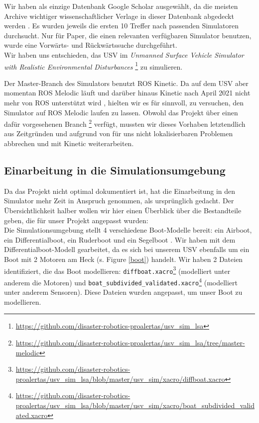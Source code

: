 \documentclass[conference]{IEEEtran}
\begin{document}
Wir haben als einzige Datenbank Google Scholar ausgewählt, da die meisten Archive wichtiger wissenschaftlicher Verlage in dieser Datenbank abgedeckt werden \cite{googlescholar}. Es wurden jeweils die ersten 10 Treffer nach passenden Simulatoren durchsucht. Nur für Paper, die einen relevanten verfügbaren Simulator benutzen, wurde eine Vorwärts- und Rückwärtssuche durchgeführt.\\

Wir haben uns entschieden, das USV im \textit{Unmanned Surface Vehicle Simulator with Realistic Environmental Disturbances} \footnote{\url{https://github.com/disaster-robotics-proalertas/usv_sim_lsa}} zu simulieren.

Der Master-Branch des Simulators benutzt ROS Kinetic. Da auf dem USV aber momentan ROS Melodic läuft und darüber hinaus Kinetic nach April 2021 nicht mehr von ROS unterstützt wird \cite{rosdistros}, hielten wir es für sinnvoll, zu versuchen, den Simulator auf ROS Melodic laufen zu lassen. Obwohl das Projekt über einen dafür vorgesehenen Branch \footnote{\url{https://github.com/disaster-robotics-proalertas/usv_sim_lsa/tree/master-melodic}} verfügt, mussten wir dieses Vorhaben letztendlich aus Zeitgründen und aufgrund von für uns nicht lokalisierbaren Problemen abbrechen und mit Kinetic weiterarbeiten.

\subsection{Einarbeitung in die Simulationsumgebung}

Da das Projekt nicht optimal dokumentiert ist, hat die Einarbeitung in den Simulator mehr Zeit in Anspruch genommen, als ursprünglich gedacht. Der Übersichtlichkeit halber wollen wir hier einen Überblick über die Bestandteile geben, die für unser Projekt angepasst wurden:\\
Die Simulationsumgebung stellt 4 verschiedene Boot-Modelle bereit: ein Airboot, ein Differentialboot, ein Ruderboot und ein Segelboot \cite{paravisi2019}. Wir haben mit dem Differentialboot-Modell gearbeitet, da es sich bei unserem USV ebenfalls um ein Boot mit 2 Motoren am Heck (s. Figure \ref{boot}) handelt. Wir haben 2 Dateien identifiziert, die das Boot modellieren: \texttt{diffboat.xacro}\footnote{\url{https://github.com/disaster-robotics-proalertas/usv_sim_lsa/blob/master/usv_sim/xacro/diffboat.xacro}} (modelliert unter anderem die Motoren) und \texttt{boat\_subdivided\_validated.xacro}\footnote{\url{https://github.com/disaster-robotics-proalertas/usv_sim_lsa/blob/master/usv_sim/xacro/boat_subdivided_validated.xacro}} (modelliert unter anderem Sensoren). Diese Dateien wurden angepasst, um unser Boot zu modellieren.
\end{document}
